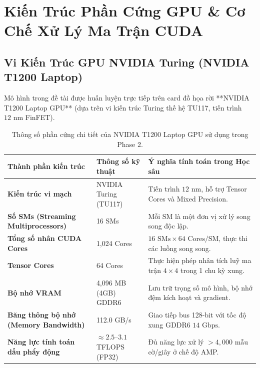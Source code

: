 \documentclass[11pt,a4paper]{report}
\begin{document}
\chapter{Kiến Trúc Phần Cứng GPU \& Cơ Chế Xử Lý Ma Trận CUDA}

\section{Vi Kiến Trúc GPU NVIDIA Turing (NVIDIA T1200 Laptop)}

Mô hình trong đề tài được huấn luyện trực tiếp trên card đồ họa rời **NVIDIA T1200 Laptop GPU** (dựa trên vi kiến trúc Turing thế hệ TU117, tiến trình $12\text{ nm}$ FinFET).

\begin{table}[htbp]
\centering
\caption{Thông số phần cứng chi tiết của NVIDIA T1200 Laptop GPU sử dụng trong Phase 2.}
\label{tab:gpu_hardware_specs}
\small
\begin{tabularx}{\textwidth}{p{4.5cm} p{3.5cm} X}
\toprule
\textbf{Thành phần kiến trúc} & \textbf{Thông số kỹ thuật} & \textbf{Ý nghĩa tính toán trong Học sâu} \\
\midrule
\textbf{Kiến trúc vi mạch} & NVIDIA Turing (TU117) & Tiến trình $12\text{ nm}$, hỗ trợ Tensor Cores và Mixed Precision. \\
\textbf{Số SMs (Streaming Multiprocessors)} & 16 SMs & Mỗi SM là một đơn vị xử lý song song độc lập. \\
\textbf{Tổng số nhân CUDA Cores} & 1,024 Cores & $16 \text{ SMs} \times 64 \text{ Cores/SM}$, thực thi các luồng song song. \\
\textbf{Tensor Cores} & 64 Cores & Thực hiện phép nhân tích luỹ ma trận $4 \times 4$ trong 1 chu kỳ xung. \\
\textbf{Bộ nhớ VRAM} & 4,096 MB (4GB) GDDR6 & Lưu trữ trọng số mô hình, bộ nhớ đệm kích hoạt và gradient. \\
\textbf{Băng thông bộ nhớ (Memory Bandwidth)} & 112.0 GB/s & Giao tiếp bus 128-bit với tốc độ xung GDDR6 $14\text{ Gbps}$. \\
\textbf{Năng lực tính toán dấu phẩy động} & $\approx 2.5\text{--}3.1$ TFLOPS (FP32) & Đủ năng lực xử lý $> 4,000$ mẫu cờ/giây ở chế độ AMP. \\
\bottomrule
\end{tabularx}
\end{table}
\end{document}
